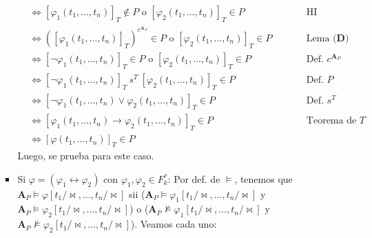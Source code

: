 \documentclass{article}
\begin{document}
\begin{enumerate}
\begin{itemize}
\begin{itemize}
\begin{equation*}
\begin{alignedat}{2}
                                                                                         & \iff [\varphi_1(t_1,\dots,t_n)]_T\notin P\text{ o }[\varphi_2(t_1,\dots,t_n)]_T\in P                                                          &  & \qquad\text{HI}                    \\
                                                                                         & \iff ([\varphi_1(t_1,\dots,t_n)]_T)^{c^{\mathbf{A}_P}}\in P\text{ o }[\varphi_2(t_1,\dots,t_n)]_T\in P                                        &  & \qquad\text{Lema }\textbf{(D)}     \\
                                                                                         & \iff [\neg\varphi_1(t_1,\dots,t_n)]_T\in P\text{ o }[\varphi_2(t_1,\dots,t_n)]_T\in P                                                         &  & \qquad\text{Def. }c^{\mathbf{A}_P} \\
                                                                                         & \iff [\neg\varphi_1(t_1,\dots,t_n)]_T\ s^T\ [\varphi_2(t_1,\dots,t_n)]_T\in P                                                                 &  & \qquad\text{Def. }P                \\
                                                                                         & \iff [\neg\varphi_1(t_1,\dots,t_n)\lor\varphi_2(t_1,\dots,t_n)]_T\in P                                                                        &  & \qquad\text{Def. }s^T              \\
                                                                                         & \iff [\varphi_1(t_1,\dots,t_n)\to\varphi_2(t_1,\dots,t_n)]_T\in P                                                                             &  & \qquad\text{Teorema de }T          \\
                                                                                         & \iff [\varphi(t_1,\dots,t_n)]_T\in P
                          \end{alignedat}
                        \end{equation*}
                        Luego, se prueba para este caso.
                  \item Si $\varphi=(\varphi_1\leftrightarrow\varphi_2)$ con $\varphi_1,\varphi_2\in F^\tau_k$: Por def. de $\vDash$, tenemos que $\mathbf{A}_P\vDash\varphi[t_1/\!\bowtie,\dots,t_n/\!\bowtie]$ sii ($\mathbf{A}_P\vDash\varphi_1[t_1/\!\bowtie,\dots,t_n/\!\bowtie]$ y $\mathbf{A}_P\vDash\varphi_2[t_1/\!\bowtie,\dots,t_n/\!\bowtie]$) o ($\mathbf{A}_P\nvDash\varphi_1[t_1/\!\bowtie,\dots,t_n/\!\bowtie]$ y $\mathbf{A}_P\nvDash\varphi_2[t_1/\!\bowtie,\dots,t_n/\!\bowtie]$). Veamos cada uno:

\end{itemize}
\end{itemize}
\end{enumerate}
\end{document}
